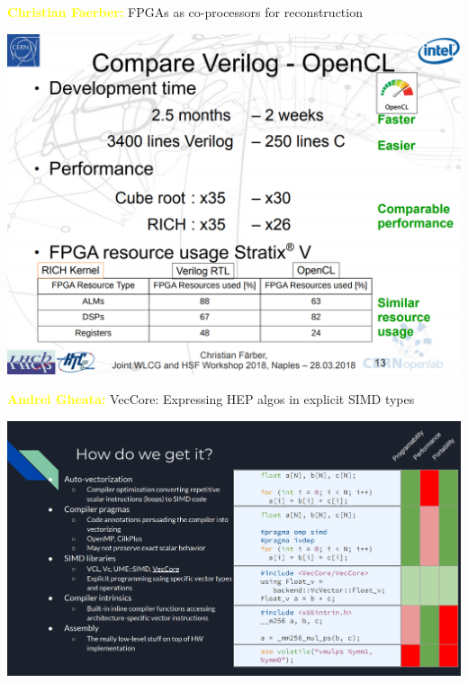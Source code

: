 \documentclass[aspectratio=169]{beamer}
\begin{document}
\begin{frame}{\textcolor{yellow}{\bf Christian Faerber:} FPGAs as co-processors for reconstruction}
\vspace{0.13 cm}
\begin{center}
\includegraphics[width=0.73\linewidth]{fpgas-3.png}
\end{center}
\end{frame}

\begin{frame}{\textcolor{yellow}{\bf Andrei Gheata:} VecCore: Expressing HEP algos in explicit SIMD types}
\vspace{0.13 cm}
\begin{center}
\includegraphics[width=0.95\linewidth]{veccore-1.png}
\end{center}
\end{frame}
\end{document}
